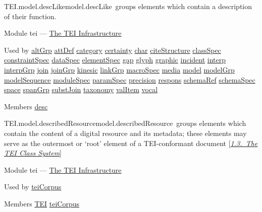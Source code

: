 \begin{reflist}
\item[]\begin{specHead}{TEI.model.descLike}{model.descLike} groups elements which contain a description of their function.\end{specHead} 
    \item[{Module}]
  tei — \hyperref[ST]{The TEI Infrastructure}
    \item[{Used by}]
  \hyperref[TEI.altGrp]{altGrp} \hyperref[TEI.attDef]{attDef} \hyperref[TEI.category]{category} \hyperref[TEI.certainty]{certainty} \hyperref[TEI.char]{char} \hyperref[TEI.citeStructure]{citeStructure} \hyperref[TEI.classSpec]{classSpec} \hyperref[TEI.constraintSpec]{constraintSpec} \hyperref[TEI.dataSpec]{dataSpec} \hyperref[TEI.elementSpec]{elementSpec} \hyperref[TEI.gap]{gap} \hyperref[TEI.glyph]{glyph} \hyperref[TEI.graphic]{graphic} \hyperref[TEI.incident]{incident} \hyperref[TEI.interp]{interp} \hyperref[TEI.interpGrp]{interpGrp} \hyperref[TEI.join]{join} \hyperref[TEI.joinGrp]{joinGrp} \hyperref[TEI.kinesic]{kinesic} \hyperref[TEI.linkGrp]{linkGrp} \hyperref[TEI.macroSpec]{macroSpec} \hyperref[TEI.media]{media} \hyperref[TEI.model]{model} \hyperref[TEI.modelGrp]{modelGrp} \hyperref[TEI.modelSequence]{modelSequence} \hyperref[TEI.moduleSpec]{moduleSpec} \hyperref[TEI.paramSpec]{paramSpec} \hyperref[TEI.precision]{precision} \hyperref[TEI.respons]{respons} \hyperref[TEI.schemaRef]{schemaRef} \hyperref[TEI.schemaSpec]{schemaSpec} \hyperref[TEI.space]{space} \hyperref[TEI.spanGrp]{spanGrp} \hyperref[TEI.substJoin]{substJoin} \hyperref[TEI.taxonomy]{taxonomy} \hyperref[TEI.valItem]{valItem} \hyperref[TEI.vocal]{vocal}
    \item[{Members}]
  \hyperref[TEI.desc]{desc}
\end{reflist}  
\begin{reflist}
\item[]\begin{specHead}{TEI.model.describedResource}{model.describedResource} groups elements which contain the content of a digital resource and its metadata; these elements may serve as the outermost or ‘root’ element of a TEI-conformant document [\textit{\hyperref[STEC]{1.3.\ The TEI Class System}}]\end{specHead} 
    \item[{Module}]
  tei — \hyperref[ST]{The TEI Infrastructure}
    \item[{Used by}]
  \hyperref[TEI.teiCorpus]{teiCorpus}
    \item[{Members}]
  \hyperref[TEI.TEI]{TEI} \hyperref[TEI.teiCorpus]{teiCorpus}
\end{reflist}  
